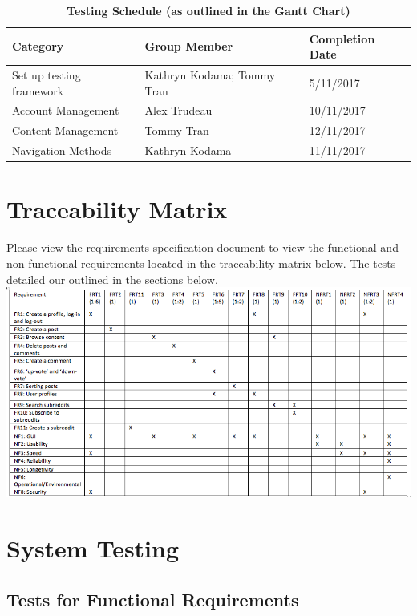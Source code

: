 \documentclass[12pt,fleqn]{article}
\begin{document}
\begin{table}[ht]
\caption{\bf Testing Schedule (as outlined in the Gantt Chart)}
\begin{tabularx}{\textwidth}{p{3cm}p{2cm}X}
\toprule {\bf Category} & {\bf Group Member} & {\bf Completion Date}\\
\midrule
Set up testing framework & Kathryn Kodama; Tommy Tran & 5/11/2017 \\
Account Management & Alex Trudeau & 10/11/2017\\
Content Management & Tommy Tran & 12/11/2017 \\
Navigation Methods & Kathryn Kodama & 11/11/2017\\ 
\bottomrule
\end{tabularx}
\end{table}


\pagebreak

\section{Traceability Matrix}
Please view the requirements specification document to view the functional and non-functional requirements located in the traceability matrix below.  The tests detailed our outlined in the sections below.\\
\newline
\includegraphics[scale=0.55]{matrix.png}

\pagebreak
\section{System Testing}
\subsection{Tests for Functional Requirements}
\end{document}
